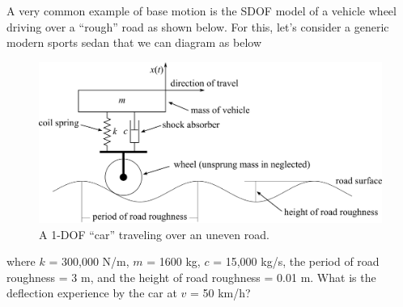 \documentclass[12pt,letter]{article}
\begin{document}
		\begin{example}

			A very common example of base motion is the SDOF model of a vehicle wheel driving over a ``rough'' road as shown below. For this, let's consider a generic modern sports sedan that we can diagram as below
			\begin{figure}[H]
				\centering
				\includegraphics[]{../figures/vehicle_on_road_example.png}
				\caption{A 1-DOF ``car'' traveling over an uneven road.}
			\end{figure}				
			\noindent where $k$ = 300,000 N/m, $m$ = 1600 kg, $c$ = 15,000 kg/s, the period of road roughness = 3 m, and the height of road roughness = 0.01 m. What is the deflection experience by the car at $v$ = 50 km/h?
			

\end{example}
\end{document}
